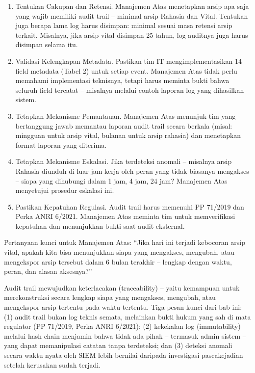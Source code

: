 \documentclass[12pt,a4paper]{report}
\begin{document}
\begin{enumerate}[leftmargin=*]
    \item Tentukan Cakupan dan Retensi. Manajemen Atas menetapkan arsip apa saja yang wajib memiliki audit trail -- minimal arsip Rahasia dan Vital. Tentukan juga berapa lama log harus disimpan: minimal sesuai masa retensi arsip terkait. Misalnya, jika arsip vital disimpan 25 tahun, log auditnya juga harus disimpan selama itu.
    \item Validasi Kelengkapan Metadata. Pastikan tim IT mengimplementasikan 14 field metadata (Tabel 2) untuk setiap event. Manajemen Atas tidak perlu memahami implementasi teknisnya, tetapi harus meminta bukti bahwa seluruh field tercatat -- misalnya melalui contoh laporan log yang dihasilkan sistem.
    \item Tetapkan Mekanisme Pemantauan. Manajemen Atas menunjuk tim yang bertanggung jawab memantau laporan audit trail secara berkala (misal: mingguan untuk arsip vital, bulanan untuk arsip rahasia) dan menetapkan format laporan yang diterima.
    \item Tetapkan Mekanisme Eskalasi. Jika terdeteksi anomali -- misalnya arsip Rahasia diunduh di luar jam kerja oleh peran yang tidak biasanya mengakses -- siapa yang dihubungi dalam 1 jam, 4 jam, 24 jam? Manajemen Atas menyetujui prosedur eskalasi ini.
    \item Pastikan Kepatuhan Regulasi. Audit trail harus memenuhi PP 71/2019 dan Perka ANRI 6/2021. Manajemen Atas meminta tim untuk memverifikasi kepatuhan dan menunjukkan bukti saat audit eksternal.
\end{enumerate}

Pertanyaan kunci untuk Manajemen Atas: ``Jika hari ini terjadi kebocoran arsip vital, apakah kita bisa menunjukkan siapa yang mengakses, mengubah, atau mengekspor arsip tersebut dalam 6 bulan terakhir -- lengkap dengan waktu, peran, dan alasan aksesnya?''

\begin{plnbox}
Audit trail mewujudkan keterlacakan (traceability) -- yaitu kemampuan untuk merekonstruksi secara lengkap siapa yang mengakses, mengubah, atau mengekspor arsip tertentu pada waktu tertentu. Tiga pesan kunci dari bab ini: (1) audit trail bukan log teknis semata, melainkan bukti hukum yang sah di mata regulator (PP 71/2019, Perka ANRI 6/2021); (2) kekekalan log (immutability) melalui hash chain menjamin bahwa tidak ada pihak -- termasuk admin sistem -- yang dapat memanipulasi catatan tanpa terdeteksi; dan (3) deteksi anomali secara waktu nyata oleh SIEM lebih bernilai daripada investigasi pascakejadian setelah kerusakan sudah terjadi.
\end{plnbox}
\end{document}
